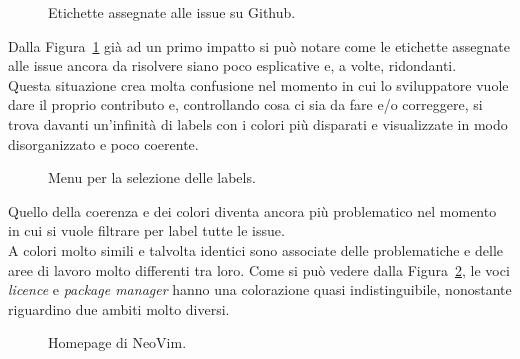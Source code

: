 \documentclass[12pt]{article} %
\begin{document}
\begin{figure}[H]
\caption{Etichette assegnate alle issue su Github.}
\label{fig:cattivoesempio1}
\end{figure}

Dalla Figura~\ref{fig:cattivoesempio1} gi\`a ad un primo impatto si pu\`o notare come le etichette assegnate alle issue ancora da risolvere siano poco esplicative e, a volte, ridondanti.\\
Questa situazione crea molta confusione nel momento in cui lo sviluppatore vuole dare il proprio contributo e, controllando cosa ci sia da fare e/o correggere, si trova davanti un'infinit\`a di labels con i colori pi\`u disparati e visualizzate in modo disorganizzato e poco coerente.

\begin{figure}[H]
\caption{Menu per la selezione delle labels.}
\label{fig:cattivoesempio2}
\end{figure}

Quello della coerenza e dei colori diventa ancora pi\`u problematico nel momento in cui si vuole filtrare per label tutte le issue.\\
A colori molto simili e talvolta identici sono associate delle problematiche e delle aree di lavoro molto differenti tra loro. Come si pu\`o vedere dalla Figura~\ref{fig:cattivoesempio2}, le voci \emph{licence} e \emph{package manager} hanno una colorazione quasi indistinguibile, nonostante riguardino due ambiti molto diversi.

\begin{figure}[H]
\caption{Homepage di NeoVim.}
\label{fig:cattivoesempio3}
\end{figure}
\end{document}
